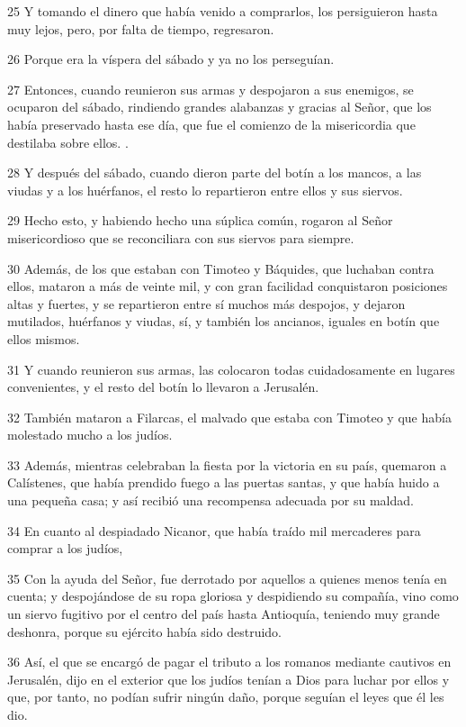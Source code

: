 \par 25 Y tomando el dinero que había venido a comprarlos, los persiguieron hasta muy lejos, pero, por falta de tiempo, regresaron.
\par 26 Porque era la víspera del sábado y ya no los perseguían.
\par 27 Entonces, cuando reunieron sus armas y despojaron a sus enemigos, se ocuparon del sábado, rindiendo grandes alabanzas y gracias al Señor, que los había preservado hasta ese día, que fue el comienzo de la misericordia que destilaba sobre ellos. .
\par 28 Y después del sábado, cuando dieron parte del botín a los mancos, a las viudas y a los huérfanos, el resto lo repartieron entre ellos y sus siervos.
\par 29 Hecho esto, y habiendo hecho una súplica común, rogaron al Señor misericordioso que se reconciliara con sus siervos para siempre.
\par 30 Además, de los que estaban con Timoteo y Báquides, que luchaban contra ellos, mataron a más de veinte mil, y con gran facilidad conquistaron posiciones altas y fuertes, y se repartieron entre sí muchos más despojos, y dejaron mutilados, huérfanos y viudas, sí, y también los ancianos, iguales en botín que ellos mismos.
\par 31 Y cuando reunieron sus armas, las colocaron todas cuidadosamente en lugares convenientes, y el resto del botín lo llevaron a Jerusalén.
\par 32 También mataron a Filarcas, el malvado que estaba con Timoteo y que había molestado mucho a los judíos.
\par 33 Además, mientras celebraban la fiesta por la victoria en su país, quemaron a Calístenes, que había prendido fuego a las puertas santas, y que había huido a una pequeña casa; y así recibió una recompensa adecuada por su maldad.
\par 34 En cuanto al despiadado Nicanor, que había traído mil mercaderes para comprar a los judíos,
\par 35 Con la ayuda del Señor, fue derrotado por aquellos a quienes menos tenía en cuenta; y despojándose de su ropa gloriosa y despidiendo su compañía, vino como un siervo fugitivo por el centro del país hasta Antioquía, teniendo muy grande deshonra, porque su ejército había sido destruido.
\par 36 Así, el que se encargó de pagar el tributo a los romanos mediante cautivos en Jerusalén, dijo en el exterior que los judíos tenían a Dios para luchar por ellos y que, por tanto, no podían sufrir ningún daño, porque seguían el leyes que él les dio.

